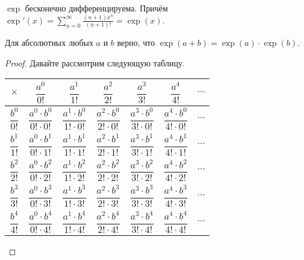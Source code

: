 \documentclass[12pt,a4paper]{article}
\begin{document}
    \begin{corollary}
        $\exp$ бесконечно дифференцируема. Причём $\exp'(x) = \sum_{n=0}^\infty \frac{(n+1)x^n}{(n+1)!} = \exp(x)$.
    \end{corollary}

    \begin{statement}
        Для абсолютных любых $a$ и $b$ верно, что $\exp(a+b) = \exp(a) \cdot \exp(b)$.
    \end{statement}

    \begin{proof}
        Давайте рассмотрим следующую таблицу.
        \begin{table}[H]
            \centering
            \begin{tabular}{c||c|c|c|c|c|c}
                \raisebox{-14pt}{\rule{0pt}{36pt}}$\times$ & $\dfrac{a^0}{0!}$ & $\dfrac{a^1}{1!}$ & $\dfrac{a^2}{2!}$ & $\dfrac{a^3}{3!}$ & $\dfrac{a^4}{4!}$ & $\cdots$\\
                \hline
                \hline
                \raisebox{-14pt}{\rule{0pt}{36pt}}$\dfrac{b^0}{0!}$ & $\dfrac{a^0 \cdot b^0}{0! \cdot 0!}$ & $\dfrac{a^1 \cdot b^0}{1! \cdot 0!}$ & $\dfrac{a^2 \cdot b^0}{2! \cdot 0!}$ & $\dfrac{a^3 \cdot b^0}{3! \cdot 0!}$ & $\dfrac{a^4 \cdot b^0}{4! \cdot 0!}$ & $\cdots$\\
                \hline
                \raisebox{-14pt}{\rule{0pt}{36pt}}$\dfrac{b^1}{1!}$ & $\dfrac{a^0 \cdot b^1}{0! \cdot 1!}$ & $\dfrac{a^1 \cdot b^1}{1! \cdot 1!}$ & $\dfrac{a^2 \cdot b^1}{2! \cdot 1!}$ & $\dfrac{a^3 \cdot b^1}{3! \cdot 1!}$ & $\dfrac{a^4 \cdot b^1}{4! \cdot 1!}$ & $\cdots$\\
                \hline
                \raisebox{-14pt}{\rule{0pt}{36pt}}$\dfrac{b^2}{2!}$ & $\dfrac{a^0 \cdot b^2}{0! \cdot 2!}$ & $\dfrac{a^1 \cdot b^2}{1! \cdot 2!}$ & $\dfrac{a^2 \cdot b^2}{2! \cdot 2!}$ & $\dfrac{a^3 \cdot b^2}{3! \cdot 2!}$ & $\dfrac{a^4 \cdot b^2}{4! \cdot 2!}$ & $\cdots$\\
                \hline
                \raisebox{-14pt}{\rule{0pt}{36pt}}$\dfrac{b^3}{3!}$ & $\dfrac{a^0 \cdot b^3}{0! \cdot 3!}$ & $\dfrac{a^1 \cdot b^3}{1! \cdot 3!}$ & $\dfrac{a^2 \cdot b^3}{2! \cdot 3!}$ & $\dfrac{a^3 \cdot b^3}{3! \cdot 3!}$ & $\dfrac{a^4 \cdot b^3}{4! \cdot 3!}$ & $\cdots$\\
                \hline
                \raisebox{-14pt}{\rule{0pt}{36pt}}$\dfrac{b^4}{4!}$ & $\dfrac{a^0 \cdot b^4}{0! \cdot 4!}$ & $\dfrac{a^1 \cdot b^4}{1! \cdot 4!}$ & $\dfrac{a^2 \cdot b^4}{2! \cdot 4!}$ & $\dfrac{a^3 \cdot b^4}{3! \cdot 4!}$ & $\dfrac{a^4 \cdot b^4}{4! \cdot 4!}$ & $\cdots$\\

\end{tabular}
\end{table}
\end{proof}
\end{document}

